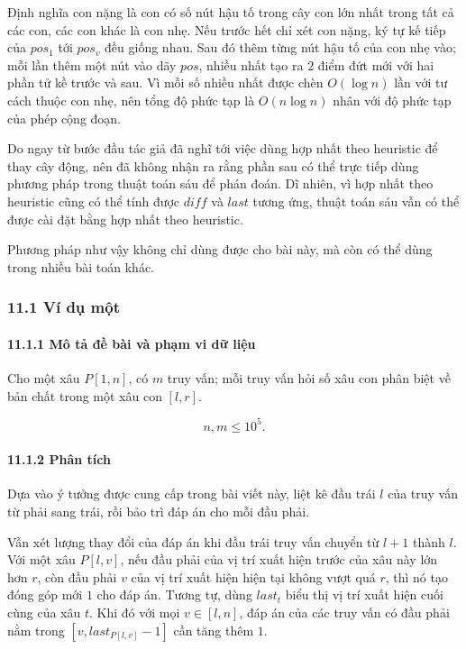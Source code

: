 \documentclass[11pt]{article}
\begin{document}
Định nghĩa con nặng là con có số nút hậu tố trong cây con lớn nhất trong tất cả
các con, các con khác là con nhẹ. Nếu trước hết chỉ xét con nặng, ký tự kế tiếp
của \(pos_1\) tới \(pos_v\) đều giống nhau. Sau đó thêm từng nút hậu tố của con
nhẹ vào; mỗi lần thêm một nút vào dãy \(pos\), nhiều nhất tạo ra \(2\) điểm đứt
mới với hai phần tử kề trước và sau. Vì mỗi số nhiều nhất được chèn \(O(\log n)\)
lần với tư cách thuộc con nhẹ, nên tổng độ phức tạp là \(O(n\log n)\) nhân với
độ phức tạp của phép cộng đoạn.

Do ngay từ bước đầu tác giả đã nghĩ tới việc dùng hợp nhất theo heuristic để
thay cây động, nên đã không nhận ra rằng phần sau có thể trực tiếp dùng phương
pháp trong thuật toán sáu để phán đoán. Dĩ nhiên, vì hợp nhất theo heuristic
cũng có thể tính được \(diff\) và \(last\) tương ứng, thuật toán sáu vẫn có thể
được cài đặt bằng hợp nhất theo heuristic.

Phương pháp như vậy không chỉ dùng được cho bài này, mà còn có thể dùng trong
nhiều bài toán khác.

\subsubsection*{11.1 Ví dụ một}

\paragraph{11.1.1 Mô tả đề bài và phạm vi dữ liệu}

Cho một xâu \(P[1,n]\), có \(m\) truy vấn; mỗi truy vấn hỏi số xâu con phân biệt
về bản chất trong một xâu con \([l,r]\).

\[
  n,m\le 10^5 .
\]

\paragraph{11.1.2 Phân tích}

Dựa vào ý tưởng được cung cấp trong bài viết này, liệt kê đầu trái \(l\) của
truy vấn từ phải sang trái, rồi bảo trì đáp án cho mỗi đầu phải.

Vẫn xét lượng thay đổi của đáp án khi đầu trái truy vấn chuyển từ \(l+1\) thành
\(l\). Với một xâu \(P[l,v]\), nếu đầu phải của vị trí xuất hiện trước của xâu
này lớn hơn \(r\), còn đầu phải \(v\) của vị trí xuất hiện hiện tại không vượt
quá \(r\), thì nó tạo đóng góp mới \(1\) cho đáp án. Tương tự, dùng \(last_t\)
biểu thị vị trí xuất hiện cuối cùng của xâu \(t\). Khi đó với mọi
\(v\in[l,n]\), đáp án của các truy vấn có đầu phải nằm trong
\([v,last_{P[l,v]}-1]\) cần tăng thêm \(1\).
\end{document}
